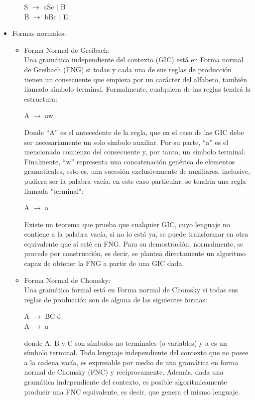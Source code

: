 \documentclass[12pt,a4paper,spanish]{book}
\begin{document}
\begin{itemize}
\begin{enumerate}
    S  $\rightarrow$ aSc $\mid$ B\\
    B $\rightarrow$ bBc $\mid$ E\\
\end{enumerate}
\item Formas normales:
\begin{itemize}
\item Forma Normal de Greibach:\\
\newline
Una gram\'atica independiente del contexto (GIC) est\'a en Forma normal de Greibach (FNG) si todas y cada una de sus reglas de producci\'on tienen un consecuente que empieza por un car\'acter del alfabeto, tambi\'en llamado s\'imbolo terminal. Formalmente, cualquiera de las reglas tendr\'a la estructura:\\
\begin{center}
A $\rightarrow$ aw
\end{center}
Donde ``A'' es el antecedente de la regla, que en el caso de las GIC debe ser necesariamente un solo s\'imbolo auxiliar. Por su parte, ``a'' es el mencionado comienzo del consecuente y, por tanto, un s\'imbolo terminal. Finalmente, ``w'' representa una concatenaci\'on gen\'erica de elementos gramaticales, esto es, una sucesi\'on exclusivamente de auxiliares, inclusive, pudiera ser la palabra vac\'ia; en este caso particular, se tendr\'ia una regla llamada "terminal":\\
\begin{center}
A $\rightarrow$ a
\end{center}
Existe un teorema que prueba que cualquier GIC, cuyo lenguaje no contiene a la palabra vac\'ia, si no lo est\'a ya, se puede transformar en otra equivalente que s\'i est\'e en FNG. Para su demostraci\'on, normalmente, se procede por construcci\'on, es decir, se plantea directamente un algoritmo capaz de obtener la FNG a partir de una GIC dada.\\
\item Forma Normal de Chomsky:\\
\newline
Una gram\'atica formal est\'a en Forma normal de Chomsky si todas sus reglas de producci\'on son de alguna de las siguientes formas:
\begin{center}
A $\rightarrow$ BC \'o\\ 
A $\rightarrow$ a\\
\end{center}
donde A, B y C son s\'imbolos no terminales (o variables) y a es un s\'imbolo terminal.
Todo lenguaje independiente del contexto que no posee a la cadena vac\'ia, es expresable por medio de una gram\'atica en forma normal de Chomsky (FNC) y rec\'iprocamente. Adem\'as, dada una gram\'atica independiente del contexto, es posible algor\'itmicamente producir una FNC equivalente, es decir, que genera el mismo lenguaje.
\end{itemize}
\end{itemize}
\end{document}

